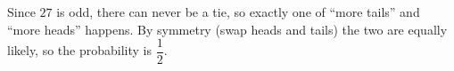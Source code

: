 Since $27$ is odd, there can never be a tie, so exactly one of ``more tails'' and ``more heads'' happens. By symmetry (swap heads and tails) the two are equally likely, so the probability is $\boxed{\dfrac{1}{2}}$.

